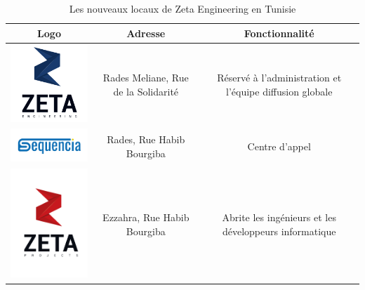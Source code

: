 \begin{table}[H]
\begin{center}
     \begin{tabular}{|c{5cm}|c{5cm}|c{5cm}|}
    \hline
	\textbf{Logo}         & \textbf{Adresse}   & \textbf{Fonctionnalité} \\
    \hline
    
	\includegraphics[width=5cm]{Images/logo-zeta1.png} & Rades Meliane, Rue de la Solidarité  & Réservé à l'administration et l'équipe diffusion globale  \\
	
 	\hline
 	
	\includegraphics[width=5cm]{Images/logo-Sequencia.png}   &  Rades, Rue Habib Bourgiba  &  Centre d'appel \\
	
	\hline
	
	\includegraphics[width=5cm]{Images/Logo-ZetaProject.png}  & Ezzahra, Rue Habib Bourgiba    & Abrite les ingénieurs et les développeurs informatique  \\
	
	\hline
	
     \end{tabular}
     \caption{Les nouveaux locaux de Zeta Engineering en Tunisie}
     \label{1}
     \end{center}
\end{table}

